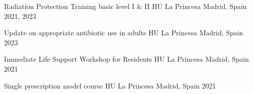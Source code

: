 \begin{cventries}
  \cventry
    {Radiation Protection Training basic level I \& II} %
    {HU La Princesa} %
    {Madrid, Spain} %
    {2021, 2023} %
    {}

  \cventry
    {Update on appropriate antibiotic use in adults} %
    {HU La Princesa} %
    {Madrid, Spain} %
    {2023} %
    {}

  \cventry
    {Immediate Life Support Workshop for Residents} %
    {HU La Princesa} %
    {Madrid, Spain} %
    {2021} %
    {}

  \cventry
    {Single prescription model course} %
    {HU La Princesa} %
    {Madrid, Spain} %
    {2021} %
    {}

\end{cventries}
